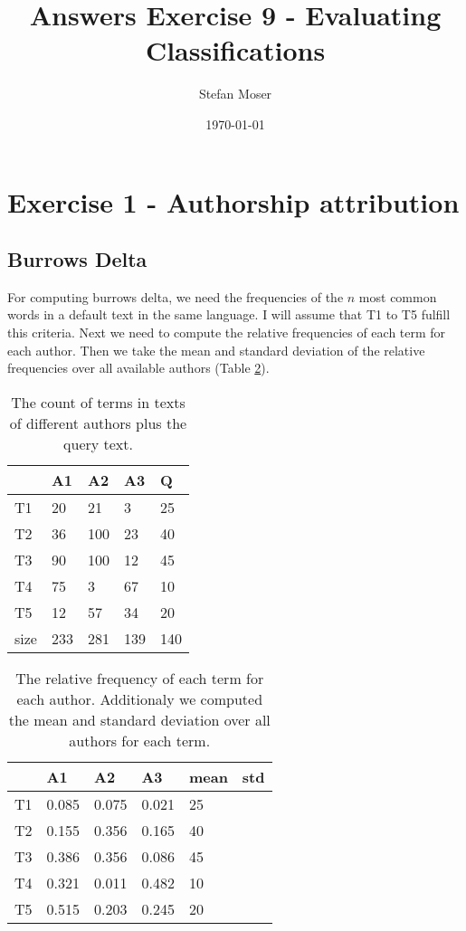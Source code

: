 \documentclass[11pt]{article}
\title{\textbf{Answers Exercise 9 - Evaluating Classifications}}
\author{Stefan Moser}
\date{\today}
\begin{document}
\maketitle

\section*{Exercise 1 - Authorship attribution}
\subsection{Burrows Delta}
For computing burrows delta, we need the 
frequencies of the $n$ most common words in a default text in the same language. I will
assume that T1 to T5 fulfill this criteria. Next we need to compute the relative frequencies of each term for each author.
Then we take the mean and standard deviation of the relative frequencies over
all available authors (Table \ref{table:rel_freq}).
\begin{table}
 \center
\begin{tabular}{|l|l|l|l|l|}
\hline
	 & A1 & A2 & A3 & Q\\
\hline
	T1 & 20 & 21 & 3 & 25\\
\hline
	T2 & 36 & 100 & 23 & 40\\
\hline
	T3 & 90 & 100 & 12 & 45\\
\hline
	T4 & 75 & 3 & 67 & 10\\
\hline
	T5 & 12 & 57 & 34 & 20\\
\hline
	size & 233 & 281 & 139 & 140\\
\hline
\end{tabular}
\caption{The count of terms in texts of different authors plus the query text.}
\label{table:count}
\end{table}
\begin{table}
\center
\begin{tabular}{|l|l|l|l|l|l|}
\hline
	 & A1 & A2 & A3 & mean & std\\
\hline
	T1 & 0.085 & 0.075 & 0.021 & 25\\
\hline
	T2 & 0.155 & 0.356 & 0.165 & 40\\
\hline
	T3 & 0.386 & 0.356 & 0.086 & 45\\
\hline
	T4 & 0.321 & 0.011 & 0.482 & 10\\
\hline
	T5 & 0.515 & 0.203 & 0.245 & 20\\
\hline
\end{tabular}
\caption{The relative frequency of each term
for each author. Additionaly we computed
the mean and standard deviation over all
authors for each term.}
\label{table:rel_freq}
\end{table}
\end{document}
